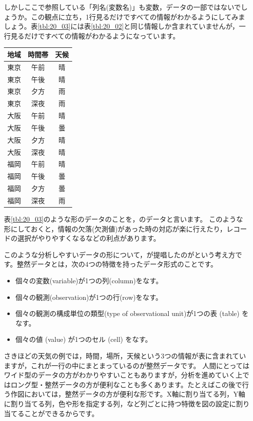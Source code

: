 \documentclass{ltjbook}
\begin{document}
しかしここで参照している「列名(変数名)」も変数，データの一部ではないでしょうか。この観点に立ち，1行見るだけですべての情報がわかるようにしてみましょう。表\ref{tbl:20_03}には表\ref{tbl:20_02}と同じ情報しか含まれていませんが，一行見るだけですべての情報がわかるようになっています。

\begin{center}
	\begin{tabular}{ccc}
		地域 & 時間帯 & 天候 \\\hline
		東京 & 午前  & 晴  \\
		東京 & 午後  & 晴  \\
		東京 & 夕方  & 雨  \\
		東京 & 深夜  & 雨  \\
		大阪 & 午前  & 晴  \\
		大阪 & 午後  & 曇  \\
		大阪 & 夕方  & 晴  \\
		大阪 & 深夜  & 晴  \\
		福岡 & 午前  & 晴  \\
		福岡 & 午後  & 曇  \\
		福岡 & 夕方  & 曇  \\
		福岡 & 深夜  & 雨  \\\hline
	\end{tabular}
	\label{tbl:20_03}
\end{center}

表\ref{tbl:20_03}のような形のデータのことを，のデータと言います。
このような形にしておくと，情報の欠落(欠測値)があった時の対応が楽に行えたり，レコードの選択がやりやすくなるなどの利点があります。

このような分析しやすいデータの形について，\textcite{Hadley2014}が提唱したのがという考え方です。整然データとは，次の4つの特徴を持ったデータ形式のことです。
\begin{itemize}
	\item 個々の変数(variable)が1つの列(column)をなす。
	\item 個々の観測(observation)が1つの行(row)をなす。
	\item 個々の観測の構成単位の類型(type of observational unit)が1つの表 (table) をなす。
	\item 個々の値 (value) が1つのセル (cell) をなす。
\end{itemize}
さきほどの天気の例では，時間，場所，天候という3つの情報が表に含まれていますが，これが一行の中にまとまっているのが整然データです。
人間にとってはワイド型のデータの方がわかりやすいこともありますが，分析を進めていく上ではロング型・整然データの方が便利なことも多くあります。たとえばこの後で行う作図においては，整然データの方が便利な形です。X軸に割り当てる列，Y軸に割り当てる列，色や形を指定する列，など列ごとに持つ特徴を図の設定に割り当てることができるからです。
\end{document}
